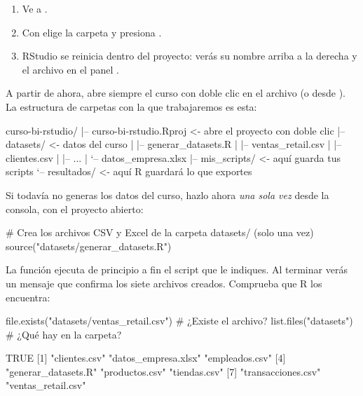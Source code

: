 \begin{enumerate}
  \item Ve a .
  \item Con  elige la carpeta  y
        presiona .
  \item RStudio se reinicia dentro del proyecto: verás su nombre arriba a la
        derecha y el archivo  en el panel
        .
\end{enumerate}

A partir de ahora, abre siempre el curso con doble clic en el archivo
 (o desde ). La estructura de
carpetas con la que trabajaremos es esta:

\begin{textocodigo}
curso-bi-rstudio/
|-- curso-bi-rstudio.Rproj      <- abre el proyecto con doble clic
|-- datasets/                   <- datos del curso
|   |-- generar_datasets.R
|   |-- ventas_retail.csv
|   |-- clientes.csv
|   |-- ...
|   `-- datos_empresa.xlsx
|-- mis_scripts/                <- aquí guarda tus scripts
`-- resultados/                 <- aquí R guardará lo que exportes
\end{textocodigo}

Si todavía no generas los datos del curso, hazlo ahora \emph{una sola vez}
desde la consola, con el proyecto abierto:

\begin{rnoejecutar}
# Crea los archivos CSV y Excel de la carpeta datasets/ (solo una vez)
source("datasets/generar_datasets.R")
\end{rnoejecutar}

La función  ejecuta de principio a fin el script que le
indiques. Al terminar verás un mensaje que confirma los siete archivos
creados. Comprueba que R los encuentra:

\begin{rcode}
file.exists("datasets/ventas_retail.csv")   # ¿Existe el archivo?
list.files("datasets")                      # ¿Qué hay en la carpeta?
\end{rcode}
\begin{rsalida}
[1] TRUE
[1] "clientes.csv"       "datos_empresa.xlsx" "empleados.csv"     
[4] "generar_datasets.R" "productos.csv"      "tiendas.csv"       
[7] "transacciones.csv"  "ventas_retail.csv" 
\end{rsalida}

